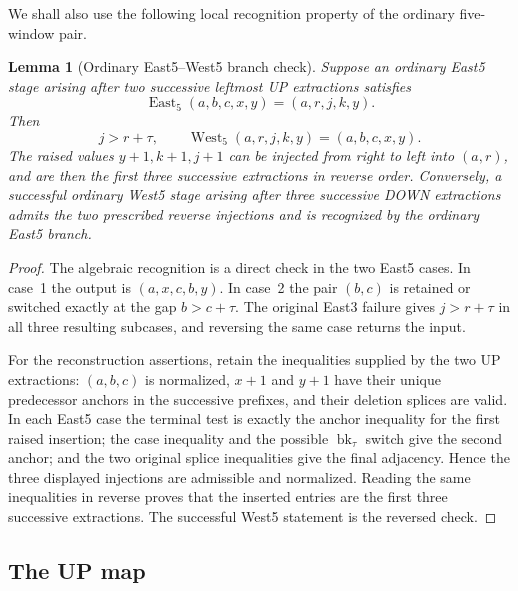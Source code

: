 \documentclass[11pt]{article}
\newtheorem{lemma}[theorem]{Lemma}
\theoremstyle{definition}
\theoremstyle{remark}
\newcommand{\East}{\operatorname{East}}
\newcommand{\West}{\operatorname{West}}
\newcommand{\bk}{\operatorname{bk}}
\begin{document}
We shall also use the following local recognition property of the ordinary
five-window pair.

\begin{lemma}[Ordinary East5--West5 branch check]
\label{lem:ordinary-five-recognition}
Suppose an ordinary East5 stage arising after two successive leftmost UP
extractions satisfies
\begin{equation}
 \East_5(a,b,c,x,y)=(a,r,j,k,y).
 \label{eq:east5-symbolic-s5}
\end{equation}
Then
\begin{equation}
 j>r+\tau,
 \qquad
 \West_5(a,r,j,k,y)=(a,b,c,x,y).
 \label{eq:east-west-inverse-s5}
\end{equation}
The raised values $y+1,k+1,j+1$ can be injected from right to left into
$(a,r)$, and are then the first three successive extractions in reverse
order.  Conversely, a successful ordinary West5 stage arising after three
successive DOWN extractions admits the two prescribed reverse injections
and is recognized by the ordinary East5 branch.
\end{lemma}

\begin{proof}
The algebraic recognition is a direct check in the two East5 cases.  In
case~1 the output is $(a,x,c,b,y)$.  In case~2 the pair $(b,c)$ is retained
or switched exactly at the gap $b>c+\tau$.  The original East3 failure gives
$j>r+\tau$ in all three resulting subcases, and reversing the same case
returns the input.

For the reconstruction assertions, retain the inequalities supplied by the
two UP extractions: $(a,b,c)$ is normalized, $x+1$ and $y+1$ have their
unique predecessor anchors in the successive prefixes, and their deletion
splices are valid.  In each East5 case the terminal test is exactly the
anchor inequality for the first raised insertion; the case inequality and
the possible $\bk_\tau$ switch give the second anchor; and the two original
splice inequalities give the final adjacency.  Hence the three displayed
injections are admissible and normalized.  Reading the same inequalities in
reverse proves that the inserted entries are the first three successive
extractions.  The successful West5 statement is the reversed check.
\end{proof}

\subsection{The UP map}
\end{document}
